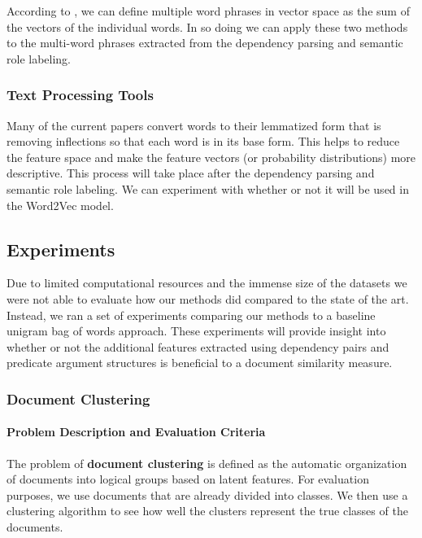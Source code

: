 \documentclass[11pt]{article}
\newcommand{\bt}[1]{\textbf{#1}}
\begin{document}
According to \cite{Mikolov2013efficient}, we can define multiple word phrases in vector space as the sum of the vectors of the individual words. In so doing we can apply these two methods to the multi-word phrases extracted from the dependency parsing and semantic role labeling. 

\subsubsection{Text Processing Tools}

Many of the current papers convert words to their lemmatized form that is removing inflections so that each word is in its base form. This helps to reduce the feature space and make the feature vectors (or probability distributions) more descriptive. This process will take place after the dependency parsing and semantic role labeling. We can experiment with whether or not it will be used in the Word2Vec model. 

\subsection{Experiments}

Due to limited computational resources and the immense size of the datasets we were not able to evaluate how our methods did compared to the state of the art. Instead, we ran a set of experiments comparing our methods to a baseline unigram bag of words approach. These experiments will provide insight into whether or not the additional features extracted using dependency pairs and predicate argument structures is beneficial to a document similarity measure. 


\subsubsection{Document Clustering} \label{sec:DocumentClusterting}

\paragraph{Problem Description and Evaluation Criteria}

The problem of \bt{document clustering} is defined as the automatic organization of documents into logical groups based on latent features. For evaluation purposes, we use documents that are already divided into classes. We then use a clustering algorithm to see how well the clusters represent the true classes of the documents. 
\end{document}
